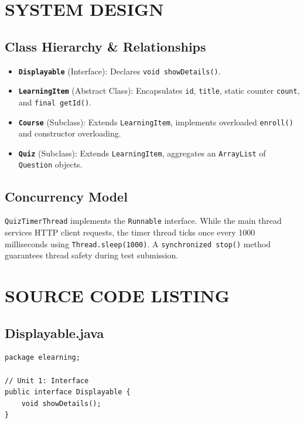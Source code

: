 \documentclass[12pt,a4paper]{article}
\begin{document}
\section{SYSTEM DESIGN}

\subsection{Class Hierarchy \& Relationships}
\begin{itemize}
    \item \textbf{\texttt{Displayable}} (Interface): Declares \texttt{void showDetails()}.
    \item \textbf{\texttt{LearningItem}} (Abstract Class): Encapsulates \texttt{id}, \texttt{title}, static counter \texttt{count}, and \texttt{final getId()}.
    \item \textbf{\texttt{Course}} (Subclass): Extends \texttt{LearningItem}, implements overloaded \texttt{enroll()} and constructor overloading.
    \item \textbf{\texttt{Quiz}} (Subclass): Extends \texttt{LearningItem}, aggregates an \texttt{ArrayList} of \texttt{Question} objects.
\end{itemize}

\subsection{Concurrency Model}
\texttt{QuizTimerThread} implements the \texttt{Runnable} interface. While the main thread services HTTP client requests, the timer thread ticks once every 1000 milliseconds using \texttt{Thread.sleep(1000)}. A \texttt{synchronized stop()} method guarantees thread safety during test submission.

\section{SOURCE CODE LISTING}

\subsection{Displayable.java}
\begin{lstlisting}
package elearning;

// Unit 1: Interface
public interface Displayable {
    void showDetails();
}
\end{lstlisting}
\end{document}
